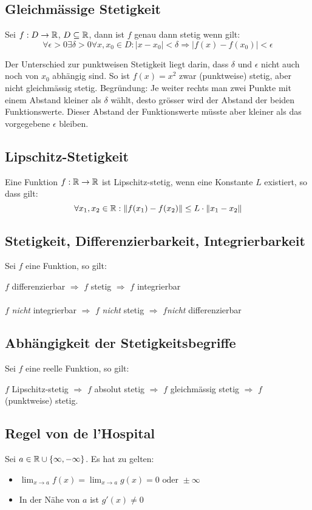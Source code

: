\subsection{Gleichmässige Stetigkeit}
Sei $f: D \to \mathbb{R}$, $D \subseteq \mathbb{R}$, dann ist $f$ genau dann stetig wenn gilt:
\[
\forall \epsilon > 0 \exists \delta > 0 \forall x,x_0 \in D: |x - x_0| < \delta
\Rightarrow |f(x) - f(x_0)| < \epsilon
\]

Der Unterschied zur punktweisen Stetigkeit liegt darin, dass $\delta$ und
$\epsilon$ nicht auch noch von $x_0$ abhängig sind. So ist $f(x) = x^2$ zwar
(punktweise) stetig, aber nicht gleichmässig stetig. Begründung: Je weiter
rechts man zwei Punkte mit einem Abstand kleiner als $\delta$ wählt, desto
grösser wird der Abstand der beiden Funktionswerte. Dieser Abstand der
Funktionswerte müsste aber kleiner als das vorgegebene $\epsilon$ bleiben.

\subsection{Lipschitz-Stetigkeit}
Eine Funktion $f: \mathbb{R} \to \mathbb{R}$ ist Lipschitz-stetig, wenn eine Konstante $L$
existiert, so dass gilt:
\[
\forall x_1,x_2 \in \mathbb{R}: \|f(x_1) - f(x_2)\| \leq L \cdot \|x_1 - x_2\|
\]

\subsection{Stetigkeit, Differenzierbarkeit, Integrierbarkeit}
Sei $f$ eine Funktion, so gilt:

$f$ differenzierbar $\Rightarrow$ $f$ stetig $\Rightarrow$ $f$ integrierbar\\
\\
$f$ \emph{nicht} integrierbar $\Rightarrow$ $f$ \emph{nicht} stetig $\Rightarrow$ $f$\emph{nicht} differenzierbar  

\subsection{Abhängigkeit der Stetigkeitsbegriffe}
Sei $f$ eine reelle Funktion, so gilt:

$f$ Lipschitz-stetig $\Rightarrow$ $f$ absolut stetig $\Rightarrow$ $f$
gleichmässig stetig $\Rightarrow$ $f$ (punktweise) stetig.

\subsection{Regel von de l'Hospital}
Sei $a \in \mathbb{R} \cup \{\infty, -\infty\}$. Es hat zu gelten:
\begin{itemize}
  \item $\lim_{x \to a} f(x) = \lim_{x \to a} g(x) = 0 \text{ oder } \pm\infty$
  \item In der Nähe von $a$ ist $g'(x) \neq 0$
\end{itemize}

